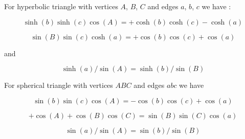 \documentclass[11pt, oneside]{article}   	%
\begin{document}
For hyperbolic triangle with vertices $A$, $B$, $C$ and edges $a$, $b$, $c$  we have :
  
  $$\sinh(b) \sinh(c) \cos(A)= +\cosh(b) \cosh(c) - \cosh(a)$$

$$\sin(B) \sin(c)\cosh(a)=+ \cos(b)\cos(c) + \cos(a)$$

and 

$$\sinh(a)/\sin(A) =\sinh(b)/\sin(B)$$


For spherical triangle with vertices $ABC$ and edges $abc$ we have

$$\sin(b) \sin(c)\cos(A)=- \cos(b) \cos(c) + \cos(a)$$

$$+\cos(A) +  \cos(B) \cos(C) =  \sin(B) \sin(C)\cos(a)$$
	
$$\sin(a)/\sin(A) = \sin(b)/\sin(B)$$
\end{document}
